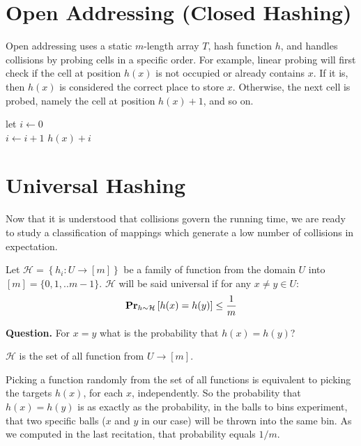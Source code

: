 \section{ Open Addressing (Closed Hashing)}
Open addressing uses a static $m$-length array $T$, hash function $h$, and handles collisions by probing cells in a specific order. For example, linear probing will first check if the cell at position $h(x)$ is not occupied or already contains $x$. If it is, then $h(x)$ is considered the correct place to store $x$. Otherwise, the next cell is probed, namely the cell at position $h(x)+1$, and so on.
  \begin{algorithm}
  \caption{linear probing - access}
  let $i \leftarrow 0 $ \\ 
   {
    $i \leftarrow i +1 $
  }
  \Return $h(x) + i$
  \end{algorithm}

\section{ Universal Hashing } 
Now that it is understood that collisions govern the running time, we are ready to study a classification of mappings which generate a low number of collisions in expectation.
\begin{definition}
  Let $\mathcal{H} = \left\{ h_{i} : U \rightarrow [m] \right\}$ be a  family of function from the domain $U$ into $[m] = \{0, 1, .. m-1\} $. $\mathcal{H}$ will be said universal if for any $x\neq y \in U$: \begin{equation*}
    \begin{split}
      \prbm{h(x) = h(y)}{h \sim \mathcal{H}} \le \frac{1}{m}
    \end{split}
  \end{equation*}
\end{definition}
\textbf{Question.} For $x = y$ what is the probability that $h(x) = h(y)$? 

\begin{example}
  $\mathcal{H}$ is the set of all function from $U \rightarrow [m]$.

  Picking a function randomly from the set of all functions is equivalent to picking the targets $h(x)$, for each $x$, independently. So the probability that $h(x) = h(y)$ is as exactly as the probability, in the balls to bins experiment, that two specific balls ($x$ and $y$ in our case) will be thrown into the same bin. As we computed in the last recitation, that probability equals $1/m$.
\end{example}


